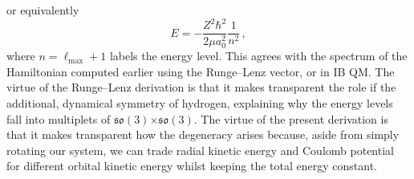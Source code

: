 \documentclass{article}
\theoremstyle{plain}\theoremheaderfont{\normalfont\itshape}\theorembodyfont{\rmfamily}\theoremseparator{.}\newtheorem*{rem}{Remark}\newtheorem*{ex}{Example}\newtheorem*{proof}{Proof}\newtheorem*{altp}{Alternative proof}
\theoremstyle{plain}\theoremheaderfont{\normalfont\bfseries}\theorembodyfont{\rmfamily}\theoremseparator{.}\newtheorem{thm}{Theorem}[section]\newtheorem{lem}[thm]{Lemma}\newtheorem{prop}[thm]{Proposition}\newtheorem*{cor}{Corollary}\newtheorem{defn}[thm]{Definition}\newtheorem{clm}[thm]{Claim}\newtheorem{clminproof}{Claim}
\theoremstyle{break}\theoremheaderfont{\normalfont\itshape}\theorembodyfont{\rmfamily}\theoremseparator{.\medskip}\newtheorem*{proofskip}{Proof}\newtheorem*{exs}{Examples}\newtheorem*{rems}{Remarks}
\theoremstyle{break}\theoremheaderfont{\normalfont\bfseries}\theorembodyfont{\rmfamily}\theoremseparator{.\medskip}\newtheorem{lemskip}[thm]{Lemma}\newtheorem{defnskip}[thm]{Definition}\newtheorem{propskip}[thm]{Proposition}\newtheorem{thmskip}[thm]{Theorem}
\numberwithin{equation}{section}
\newcommand{\cross}{\bm{\times}}
\begin{document}
    or equivalently
    \begin{equation}
        E=-\frac{Z^2\hbar^2}{2\mu a_0^2}\frac{1}{n^2}\,,
    \end{equation}
    where \(n=\ell_{\text{max}}+1\) labels the energy level. This agrees with the spectrum of the Hamiltonian computed earlier using the Runge--Lenz vector, or in IB QM. The virtue of the Runge--Lenz derivation is that it makes transparent the role if the additional, dynamical symmetry of hydrogen, explaining why the energy levels fall into multiplets of \(\mathfrak{so}(3)\cross\mathfrak{so}(3)\). The virtue of the present derivation is that it makes transparent how the degeneracy arises because, aside from simply rotating our system, we can trade radial kinetic energy and Coulomb potential for different orbital kinetic energy whilst keeping the total energy constant.
\end{document}
